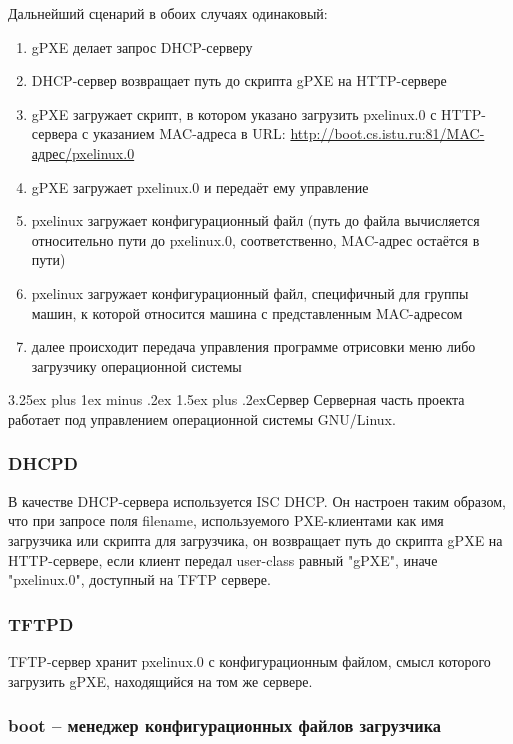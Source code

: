 \documentclass[11pt]{article}
\makeatletter
\renewcommand{\subsection}{\@startsection{subsection}{2}%
{\parindent}{3.25ex plus 1ex minus .2ex}%
{1.5ex plus .2ex}{\bfseries}}
\makeatother
\begin{document}
Дальнейший сценарий в обоих случаях одинаковый:
\begin{enumerate}
    \item gPXE делает запрос DHCP-серверу
    \item DHCP-сервер возвращает путь до скрипта gPXE на HTTP-сервере
    \item gPXE загружает скрипт, в котором указано загрузить pxelinux.0
        с HTTP-сервера с указанием MAC-адреса в URL:
        \url{http://boot.cs.istu.ru:81/MAC-адрес/pxelinux.0}
    \item gPXE загружает pxelinux.0 и передаёт ему управление
    \item pxelinux загружает конфигурационный файл (путь до файла
        вычисляется относительно пути до pxelinux.0,
        соответственно, MAC-адрес остаётся в пути)
    \item pxelinux загружает конфигурационный файл,
        специфичный для группы машин, к которой относится машина
        с представленным MAC-адресом
    \item далее происходит передача управления программе отрисовки
        меню либо загрузчику операционной системы
\end{enumerate}

\subsection{Сервер}
Серверная часть проекта работает под управлением операционной
системы GNU/Linux.

\subsubsection{DHCPD}
В качестве DHCP-сервера используется ISC DHCP.
Он настроен таким образом, что при запросе поля
filename, используемого PXE-клиентами как имя
загрузчика или скрипта для загрузчика,
он возвращает путь до скрипта gPXE на HTTP-сервере,
если клиент передал user-class равный "gPXE",
иначе "pxelinux.0", доступный на TFTP сервере.

\subsubsection{TFTPD}
TFTP-сервер хранит pxelinux.0 с конфигурационным
файлом, смысл которого загрузить gPXE, находящийся
на том же сервере.

\subsubsection{boot -- менеджер конфигурационных файлов загрузчика}
\end{document}
